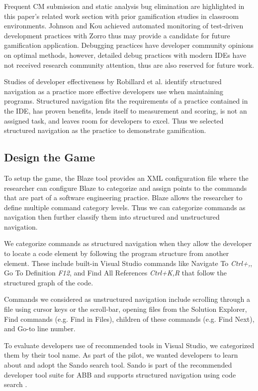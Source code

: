 \documentclass{sig-alternate}
\begin{document}
Frequent CM submission and static analysis bug elimination are highlighted in this paper's related work section with prior gamification studies in classroom environments.  Johnson and Kou achieved automated monitoring of test-driven development practices with Zorro \cite{V:Johnson2007Automated} thus may provide a candidate for future gamification application.   
Debugging practices have developer community opinions on optimal methods, however, detailed debug practices with modern IDEs have not received research community attention, thus are also reserved for future work.  

Studies of developer effectiveness by Robillard et al.\cite{wbsnipes:Robillard2004How} identify structured navigation as a practice more effective developers use when maintaining programs.   Structured navigation fits the requirements of a practice contained in the IDE, has proven benefits, lends itself to measurement and scoring, is not an assigned task, and leaves room for developers to excel.  Thus we selected structured navigation as the practice to demonstrate gamification.

\subsection{Design the Game}

To setup the game, the Blaze tool provides an XML configuration file where the researcher can configure Blaze to categorize and assign points to the commands that are part of a software engineering practice.  Blaze allows the researcher to define multiple command category levels.  Thus we can categorize commands as navigation then further classify them into structured and unstructured navigation.  

We categorize commands as structured navigation when they allow the developer to locate a code element by following the program structure from another element.  These include  built-in Visual Studio commands like Navigate To \textit{Ctrl+,}, Go To Definition \textit{F12}, and Find All References \textit{Ctrl+K,R}  that follow the structured graph of the code.

Commands we considered as unstructured navigation include scrolling through a file using cursor keys or the scroll-bar, opening files from the Solution Explorer, Find commands (e.g. Find in Files), children of these commands (e.g. Find Next), and Go-to line number.

To evaluate developers use of recommended tools in Visual Studio, we categorized them by their tool name.  As part of the pilot, we wanted developers to learn about and adopt the Sando search tool.  Sando is part of the recommended developer tool suite for ABB and supports structured navigation using code search \cite{Shepherd2012Sando}.
\end{document}

